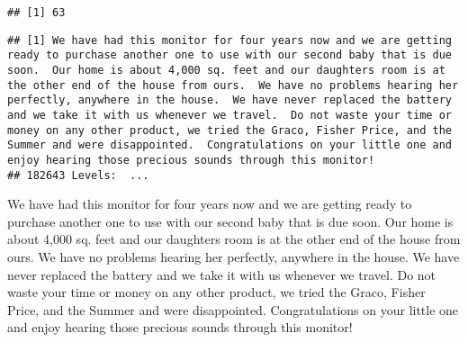 \documentclass[
]{article}
\newenvironment{Shaded}{\begin{snugshade}}{\end{snugshade}}
\newcommand{\CommentTok}[1]{\textcolor[rgb]{0.56,0.35,0.01}{\textit{#1}}}
\newcommand{\DecValTok}[1]{\textcolor[rgb]{0.00,0.00,0.81}{#1}}
\newcommand{\FunctionTok}[1]{\textcolor[rgb]{0.00,0.00,0.00}{#1}}
\newcommand{\NormalTok}[1]{#1}
\newcommand{\SpecialCharTok}[1]{\textcolor[rgb]{0.00,0.00,0.00}{#1}}
\begin{document}
\begin{verbatim}
## [1] 63
\end{verbatim}

\begin{Shaded}
\end{Shaded}

\begin{verbatim}
## [1] We have had this monitor for four years now and we are getting ready to purchase another one to use with our second baby that is due soon.  Our home is about 4,000 sq. feet and our daughters room is at the other end of the house from ours.  We have no problems hearing her perfectly, anywhere in the house.  We have never replaced the battery and we take it with us whenever we travel.  Do not waste your time or money on any other product, we tried the Graco, Fisher Price, and the Summer and were disappointed.  Congratulations on your little one and enjoy hearing those precious sounds through this monitor!
## 182643 Levels:  ...
\end{verbatim}

We have had this monitor for four years now and we are getting ready to
purchase another one to use with our second baby that is due soon. Our
home is about 4,000 sq. feet and our daughters room is at the other end
of the house from ours. We have no problems hearing her perfectly,
anywhere in the house. We have never replaced the battery and we take it
with us whenever we travel. Do not waste your time or money on any other
product, we tried the Graco, Fisher Price, and the Summer and were
disappointed. Congratulations on your little one and enjoy hearing those
precious sounds through this monitor!

\begin{Shaded}
\end{Shaded}
\end{document}
